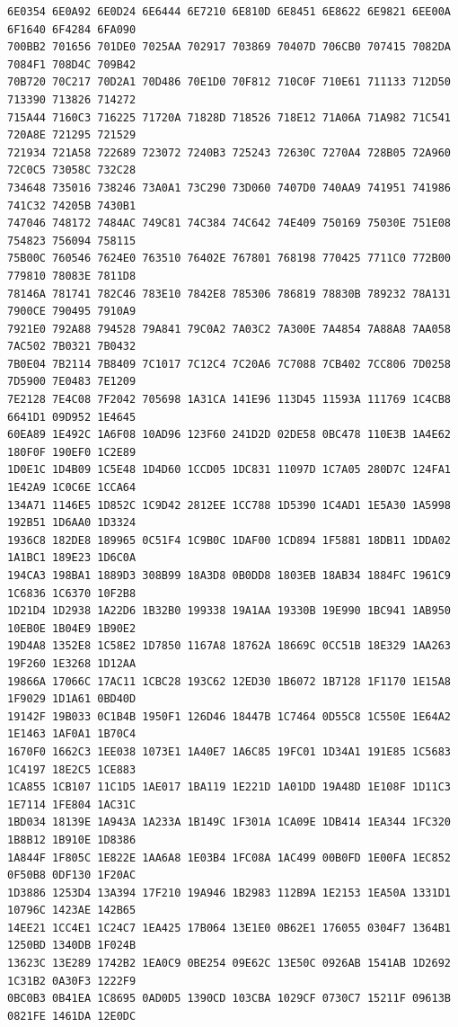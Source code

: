 \documentclass[11pt]{amsart}
\theoremstyle{remark}
\begin{document}
{\begin{verbatim}
6E0354 6E0A92 6E0D24 6E6444 6E7210 6E810D 6E8451 6E8622 6E9821 6EE00A 6F1640 6F4284 6FA090
700BB2 701656 701DE0 7025AA 702917 703869 70407D 706CB0 707415 7082DA 7084F1 708D4C 709B42
70B720 70C217 70D2A1 70D486 70E1D0 70F812 710C0F 710E61 711133 712D50 713390 713826 714272
715A44 7160C3 716225 71720A 71828D 718526 718E12 71A06A 71A982 71C541 720A8E 721295 721529
721934 721A58 722689 723072 7240B3 725243 72630C 7270A4 728B05 72A960 72C0C5 73058C 732C28
734648 735016 738246 73A0A1 73C290 73D060 7407D0 740AA9 741951 741986 741C32 74205B 7430B1
747046 748172 7484AC 749C81 74C384 74C642 74E409 750169 75030E 751E08 754823 756094 758115
75B00C 760546 7624E0 763510 76402E 767801 768198 770425 7711C0 772B00 779810 78083E 7811D8
78146A 781741 782C46 783E10 7842E8 785306 786819 78830B 789232 78A131 7900CE 790495 7910A9
7921E0 792A88 794528 79A841 79C0A2 7A03C2 7A300E 7A4854 7A88A8 7AA058 7AC502 7B0321 7B0432
7B0E04 7B2114 7B8409 7C1017 7C12C4 7C20A6 7C7088 7CB402 7CC806 7D0258 7D5900 7E0483 7E1209
7E2128 7E4C08 7F2042 705698 1A31CA 141E96 113D45 11593A 111769 1C4CB8 6641D1 09D952 1E4645
60EA89 1E492C 1A6F08 10AD96 123F60 241D2D 02DE58 0BC478 110E3B 1A4E62 180F0F 190EF0 1C2E89
1D0E1C 1D4B09 1C5E48 1D4D60 1CCD05 1DC831 11097D 1C7A05 280D7C 124FA1 1E42A9 1C0C6E 1CCA64
134A71 1146E5 1D852C 1C9D42 2812EE 1CC788 1D5390 1C4AD1 1E5A30 1A5998 192B51 1D6AA0 1D3324
1936C8 182DE8 189965 0C51F4 1C9B0C 1DAF00 1CD894 1F5881 18DB11 1DDA02 1A1BC1 189E23 1D6C0A
194CA3 198BA1 1889D3 308B99 18A3D8 0B0DD8 1803EB 18AB34 1884FC 1961C9 1C6836 1C6370 10F2B8
1D21D4 1D2938 1A22D6 1B32B0 199338 19A1AA 19330B 19E990 1BC941 1AB950 10EB0E 1B04E9 1B90E2
19D4A8 1352E8 1C58E2 1D7850 1167A8 18762A 18669C 0CC51B 18E329 1AA263 19F260 1E3268 1D12AA
19866A 17066C 17AC11 1CBC28 193C62 12ED30 1B6072 1B7128 1F1170 1E15A8 1F9029 1D1A61 0BD40D
19142F 19B033 0C1B4B 1950F1 126D46 18447B 1C7464 0D55C8 1C550E 1E64A2 1E1463 1AF0A1 1B70C4
1670F0 1662C3 1EE038 1073E1 1A40E7 1A6C85 19FC01 1D34A1 191E85 1C5683 1C4197 18E2C5 1CE883
1CA855 1CB107 11C1D5 1AE017 1BA119 1E221D 1A01DD 19A48D 1E108F 1D11C3 1E7114 1FE804 1AC31C
1BD034 18139E 1A943A 1A233A 1B149C 1F301A 1CA09E 1DB414 1EA344 1FC320 1B8B12 1B910E 1D8386
1A844F 1F805C 1E822E 1AA6A8 1E03B4 1FC08A 1AC499 00B0FD 1E00FA 1EC852 0F50B8 0DF130 1F20AC
1D3886 1253D4 13A394 17F210 19A946 1B2983 112B9A 1E2153 1EA50A 1331D1 10796C 1423AE 142B65
14EE21 1CC4E1 1C24C7 1EA425 17B064 13E1E0 0B62E1 176055 0304F7 1364B1 1250BD 1340DB 1F024B
13623C 13E289 1742B2 1EA0C9 0BE254 09E62C 13E50C 0926AB 1541AB 1D2692 1C31B2 0A30F3 1222F9
0BC0B3 0B41EA 1C8695 0AD0D5 1390CD 103CBA 1029CF 0730C7 15211F 09613B 0821FE 1461DA 12E0DC

\end{verbatim}}
\end{document}
